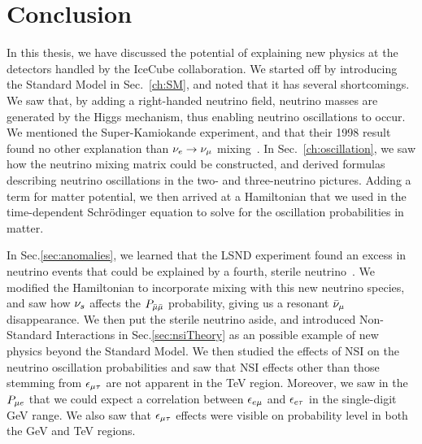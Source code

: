 \chapter{Conclusion}\label{ch:conc}
In this thesis, we have discussed the potential of explaining new physics at the detectors handled by the IceCube collaboration.
We started off by introducing the Standard Model in Sec.~\ref{ch:SM}, and noted that it has several shortcomings. We saw that, by adding a right-handed neutrino field,
neutrino masses are generated by the Higgs mechanism, thus enabling neutrino oscillations to occur. 
We mentioned the Super-Kamiokande experiment, and that their 1998 result found no other explanation than $\nu_e \to \nu_\mu$ mixing~\cite{sk1998}. In Sec.~\ref{ch:oscillation},
we saw how the neutrino mixing matrix could be constructed, and derived formulas describing neutrino oscillations in the two- and three-neutrino pictures. Adding a term for matter potential,
we then arrived at a Hamiltonian that we used in the time-dependent Schrödinger equation to solve for the oscillation probabilities in matter.

In Sec.\ref{sec:anomalies}, we learned that the LSND experiment found an excess in neutrino events that could be explained by a fourth, sterile neutrino~\cite{lsnd}.
We modified the Hamiltonian to incorporate mixing with this new neutrino species, and saw how $\nu_s$ affects the $P_{\bar{\mu} \bar{\mu}}$ probability, giving us a resonant $\bar{\nu}_\mu$ disappearance.
We then put the sterile neutrino aside, and introduced Non-Standard Interactions in Sec.\ref{sec:nsiTheory} as an possible example of new physics beyond the Standard Model.
We then studied the effects of NSI on the neutrino oscillation probabilities and saw that NSI effects other than those stemming from $\epsilon_{\mu\tau}$ are not apparent in the \si{\TeV} region.
Moreover, we saw in the $P_{\mu e}$ that we could expect a correlation between $\epsilon_{e\mu}$ and $\epsilon_{e\tau}$ in the single-digit \si{\GeV} range.
We also saw that $\epsilon_{\mu\tau}$ effects were visible on probability level in both the \si{\GeV} and \si{\TeV} regions.

